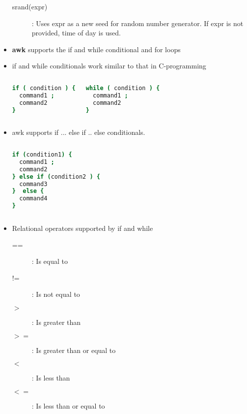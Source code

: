 \documentclass[10pt,t]{beamer}
\begin{document}
\begin{frame}
\begin{itemize}
\begin{description}
      \item[srand(expr)]: Uses expr as a new seed for random number generator. If expr is not provided, time of day is used.
    \end{description}
    \item \textbf{awk} supports the if and while conditional and for loops
    \item if and while conditionals work similar to that in C-programming
    \begin{columns}
      \begin{exampleblock}{}
        \begin{lstlisting}[language=bash]
if ( condition ) {
  command1 ;
  command2
}
        \end{lstlisting}
      \end{exampleblock}
      \begin{exampleblock}{}
        \begin{lstlisting}[language=bash]
while ( condition ) {
  command1 ;
  command2
}
        \end{lstlisting}
      \end{exampleblock}
    \end{columns}
    \framebreak
    \item awk supports if ... else if .. else conditionals. 
    \begin{columns}
      \begin{exampleblock}{}
        \begin{lstlisting}[language=bash]
if (condition1) {
  command1 ;
  command2
} else if (condition2 ) {
  command3
}  else {
  command4
}
        \end{lstlisting}
      \end{exampleblock}
    \end{columns}
    \item Relational operators supported by if and while
    \begin{description}
        \item[==]: Is equal to
        \item[!=]: Is not equal to
        \item[$>$]: Is greater than
        \item[$>=$]: Is greater than or equal to
        \item[$<$]: Is less than
        \item[$<=$]: Is less than or equal to

\end{description}
\end{itemize}
\end{frame}
\end{document}
